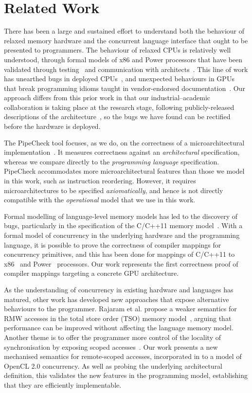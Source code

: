 \documentclass[svgnames,10pt]{sigplanconf}
\theoremstyle{definition}
\begin{document}
\section{Related Work}
\label{sec:related}
%
There has been a large and sustained effort to understand both the
behaviour of relaxed memory hardware and the concurrent language
interface that ought to be presented to programmers. The behaviour of
relaxed CPUs is relatively well understood, through formal models of
x86 and Power processors that have been validated through
testing~\cite{sewell+10, alglave+14} and communication with
architects~\cite{sarkar+11, Mador-Haim:2012:AMM:2362216.2362263}. This
line of work has unearthed bugs in deployed
CPUs~\cite{Alglave:2010:FWM:2144310.2144342}, and unexpected
behaviours in GPUs that break programming idioms taught in
vendor-endorsed documentation~\cite{alglave+15}.
Our approach differs from this prior work in that our
industrial--academic collaboration
is taking place at the research stage, following publicly-released descriptions
of the architecture~\cite{orr+15, hechtman+14}, so the bugs we have
found can be rectified before the hardware is deployed.

The PipeCheck tool focuses, as we do, on the correctness of a
microarchitectural implementation~\cite{lustig+14}. It measures
correctness against an \emph{architectural} specification, whereas we
compare directly to the \emph{programming language} specification.
PipeCheck accommodates more microarchitectural features than those we
model in this work, such as instruction reordering. However, it
requires microarchitectures to be specified \emph{axiomatically}, and
hence is not directly compatible with the \emph{operational} model
that we use in this work.

Formal modelling of language-level memory models
has led to the discovery of bugs, particularly in the
specification of the C/C++11 memory model~\cite{batty+11}. With a
formal model of concurrency in the underlying hardware and the
programming language, it is possible to prove the correctness of
compiler mappings for concurrency primitives, and this has been done
for mappings of C/C++11 to
x86~\cite{batty+11} and Power~\cite{Batty:2012:CCC:2103656.2103717,
Sarkar:2012:SCP:2254064.2254102} processors. Our work represents the
first correctness proof of compiler mappings targeting a concrete
GPU architecture.

As the understanding of concurrency in existing hardware and languages
has matured, other work has developed new approaches that expose
alternative behaviours to the programmer. Rajaram et al. propose a
weaker semantics for RMW accesses in the total store order (TSO) memory
model~\cite{Rajaram:2013:FRT:2491956.2462196}, arguing that
performance can be improved without affecting the language memory
model. Another theme is to offer the programmer more control of the
locality of synchronisation by exposing scoped accesses~\cite{7012996,
hower+14, gaster+15, wickerson+15}. Our work presents a new
mechanised semantics for remote-scoped accesses, incorporated
in to a model of OpenCL 2.0 concurrency. As well as probing
the underlying architectural definition, this validates the new
features in the programming model, establishing that they are
efficiently implementable.
\end{document}
